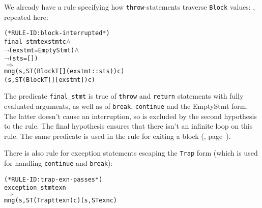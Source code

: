 \documentclass[11pt]{article}
\begin{document}
We already have a rule specifying how \texttt{throw}-statements traverse
\texttt{Block} values: , repeated here:
\begin{center}
\begin{minipage}{\textwidth}
\begin{alltt}
(* RULE-ID: block-interrupted *)
     final_stmt exstmt c \(\land\)
     \(\neg\)(exstmt = EmptyStmt) \(\land\)
     \(\neg\)(sts = [])
   \(\Rightarrow\)
     mng (s, ST (Block T [] (exstmt::sts)) c)
         (s, ST (Block T [] [exstmt]) c)
\end{alltt}
\end{minipage}
\end{center}
The predicate \texttt{final_stmt} is true of \texttt{throw} and
\texttt{return} statements with fully evaluated arguments, as well as
of \texttt{break}, \texttt{continue} and the \textsf{EmptyStmt} form.
The latter doesn't cause an interruption, so is excluded by the second
hypothesis to the rule.  The final hypothesis ensures that there isn't
an infinite loop on this rule.  The same predicate is used in the rule
for exiting a block (, page~\pageref{fig:block-exit}).

There is also rule  for exception statements
escaping the \texttt{Trap} form (which is used for handling
\texttt{continue} and \texttt{break}):
\begin{center}
\begin{minipage}{\textwidth}
%
\begin{alltt}
(* RULE-ID: trap-exn-passes *)
     exception_stmt exn
   \(\Rightarrow\)
     mng (s, ST (Trap tt exn) c) (s, ST exn c)
\end{alltt}
\end{minipage}
\end{center}
\end{document}
